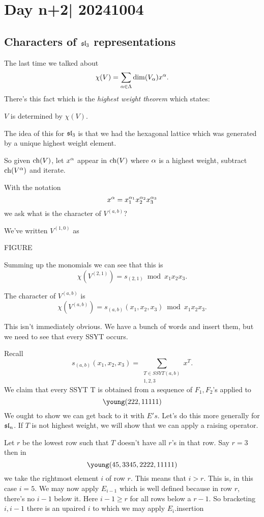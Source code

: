 \documentclass[12pt]{memoir}
\begin{document}
\section{Day n+2| 20241004}

\subsection*{Characters of $\mathfrak{sl}_3$ representations}

The last time we talked about 
$$\chi(V)=\sum_{\alpha\in\Lambda}\dim(V_\alpha)x^\alpha.$$
There's this fact which is the \emph{highest weight theorem} which states:

\begin{Th}
    $V$ is determined by $\chi(V)$.
\end{Th}

The idea of this for $\mathfrak{sl}_3$ is that we had the hexagonal lattice which was generated by a unique highest weight element.\par
So given $\operatorname{ch}(V)$, let $x^\alpha$ appear in $\operatorname{ch}(V)$ where $\alpha$ is a highest weight, subtract $\operatorname{ch}(V^\alpha)$ and iterate.\par
With the notation 
$$x^\alpha=x_1^{\alpha_1}x_2^{\alpha_2}x_3^{\alpha_3}$$
we ask what is the character of $V^{(a,b)}$?

\begin{Ex}
    We've written $V^{(1,0)}$ as 
    \begin{center}
        FIGURE
    \end{center}
    Summing up the monomials we can see that this is 
    $$\chi(V^{(2,1)})=s_{(2,1)}\bmod x_1x_2x_3.$$
\end{Ex}

\begin{Prop}
The character of $V^{(a,b)}$ is 
$$\chi(V^{(a,b)})=s_{(a,b)}(x_1,x_2,x_3)\bmod x_1x_2x_3.$$
\end{Prop}

This isn't immediately obvious. We have a bunch of words and insert them, but we need to see that every SSYT occurs.

\begin{ptcbp}
    Recall 
    $$s_{(a,b)}(x_1,x_2,x_3)=\sum_{\substack{T\in SSYT(a,b)\\ 1,2,3}}x^T.$$
    We claim that every SSYT T is obtained from a sequence of $F_1,F_2$'s applied to 
    $$\young(222,11111)$$
    We ought to show we can get back to it with $E's$. Let's do this more generally for $\mathfrak{sl}_n$. If $T$ is not highest weight, we will show that we can apply a raising operator.\par
    Let $r$ be the lowest row such that $T$ doesn't have all $r$'s in that row. Say $r=3$ then in 
    $$\young(45,3345,2222,11111)$$
    we take the rightmost element $i$ of row $r$. This means that $i>r$. This is, in this case $i=5$. We may now apply $E_{i-1}$ which is well defined because in row $r$, there's no $i-1$ below it. Here $i-1\geq r$ for all rows below a  $r-1$.
    So bracketing $i,i-1$ there is an upaired $i$ to which we may apply $E_i$.insertion 
\end{ptcbp}
\end{document}
